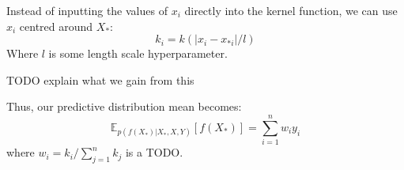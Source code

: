 Instead of inputting the values of $x_i$ directly into the kernel function, we can use $x_i$ centred around $X_*$: 
\begin{equation*}
    k_i = k(|x_i - x_{*i}|/l)
\end{equation*}
Where $l$ is some length scale hyperparameter. 

TODO explain what we gain from this

Thus, our predictive distribution mean becomes:
\begin{equation*}
    \mathbb{E}_{p(f(X_*)|X_*,X,Y)}[f(X_*)] = \sum_{i=1}^n w_i y_i
\end{equation*}
where $w_i = k_i / \sum_{j=1}^n k_j$ is a TODO.


